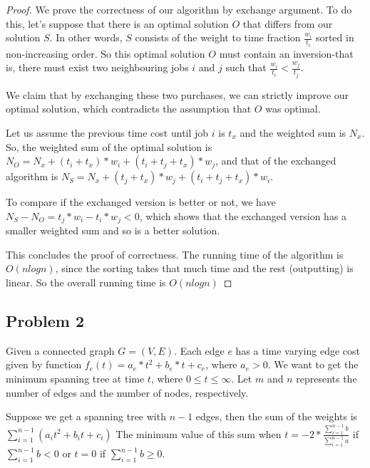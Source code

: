\documentclass[paper=a4, fontsize=11pt]{scrartcl} %
\numberwithin{equation}{section} %
\numberwithin{figure}{section} %
\numberwithin{table}{section} %
\begin{document}
\begin{proof}

We prove the correctness of our algorithm by exchange argument. To do this, let's suppose that there is an optimal solution $O$ that differs from our solution $S$. In other words, $S$ consists of the weight to time fraction $\frac{w_i}{t_i}$ sorted in non-increasing order. So this optimal solution $O$ must contain an inversion-that is, there must exist two neighbouring jobs $i$ and $j$ such that $\frac{w_i}{t_i} < \frac{w_j}{t_j}$.

We claim that by exchanging these two purchases, we can strictly improve our optimal solution, which contradicts the assumption that $O$ was optimal. 

Let us assume the previous time cost until job $i$ is $t_x$ and the weighted sum is $N_x$. So, the weighted sum of the optimal solution is $N_O = N_x + (t_i + t_x) * w_i + (t_i + t_j + t_x) * w_j$, and that of the exchanged algorithm is $N_S = N_x + (t_j + t_x) * w_j + (t_i + t_j + t_x) * w_i$. 

To compare if the exchanged version is better or not, we have $N_S - N_O = t_j * w_i - t_i * w_j < 0$, which shows that the exchanged version has a smaller weighted sum and so is a better solution. 

This concludes the proof of correctness. The running time of the algorithm is $O(nlogn)$, since the sorting takes that much time and the rest (outputting) is linear. So the overall running time is $O(nlogn)$

\end{proof}


\subsection*{Problem 2}

Given a connected graph $G = (V, E)$. Each edge $e$ has a time varying edge cost given by function $f_e(t) = a_e * t^2 + b_e * t + c_e$, where $a_e > 0$. We want to get the minimum spanning tree at time $t$, where $0 \leq t \leq \infty$. Let $m$ and $n$ represents the number of edges and the number of nodes, respectively.

Suppose we get a spanning tree with $n-1$ edges, then the sum of the weights is $\sum_{i=1}^{n-1} {(a_it^2 + b_it + c_i)}$
The minimum value of this sum when $t = -2*\frac{\sum_{i=1}^{n-1}{b}}{\sum_{i=1}^{n-1}{a}}$ if $\sum_{i=1}^{n-1}{b} < 0$ or $t = 0$ if $\sum_{i=1}^{n-1}{b} \geq 0$.
\end{document}

